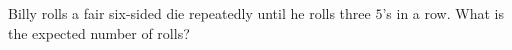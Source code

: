 Billy rolls a fair six-sided die repeatedly until he rolls three $5$'s in a row. What is the expected number of rolls?
